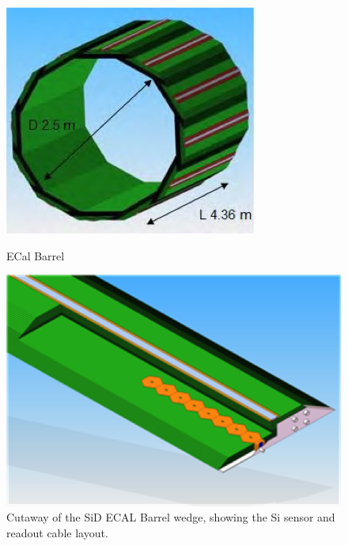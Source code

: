 \begin{figure}
	\centering
	\hspace*{\fill}
	\begin{minipage}[b]{.35\textwidth}
		\includegraphics[width=\linewidth,valign=t]{Calorimeter/SiliconTungstenSiD/ECalBarrel.png}
		\caption{ECal Barrel}
		\label{fig:Calorimeter:SiDECAL:ECalBarrel}
	\end{minipage}\hfill
	\begin{minipage}[b]{.43\textwidth}
		\includegraphics[width=\linewidth,valign=t]{Calorimeter/SiliconTungstenSiD/wedge.png}
		\caption{Cutaway of the SiD ECAL Barrel wedge,
showing the Si sensor and readout cable layout.}
		\label{fig:Calorimeter:SiDECAL:wedge}
	\end{minipage}
	\hspace*{\fill}
\end{figure}


